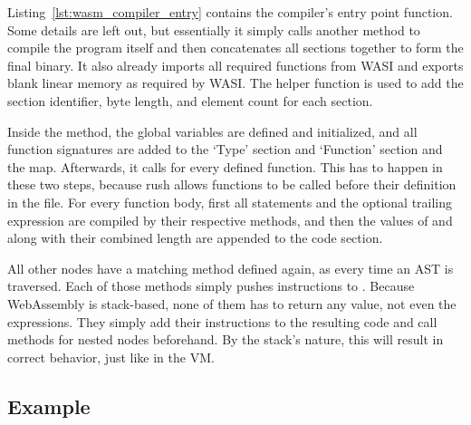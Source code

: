 Listing~\ref{lst:wasm_compiler_entry} contains the compiler's entry point function.
Some details are left out, but essentially it simply calls another method to compile the program itself and then concatenates all sections together to form the final binary.
It also already imports all required functions from WASI and exports blank linear memory as required by WASI.
The  helper function is used to add the section identifier, byte length, and element count for each section.


Inside the  method, the global variables are defined and initialized, and all function signatures are added to the `Type' section and `Function' section and the  map.
Afterwards, it calls  for every defined function.
This has to happen in these two steps, because rush allows functions to be called before their definition in the file.
For every function body, first all statements and the optional trailing expression are compiled by their respective methods, and then the values of  and  along with their combined length are appended to the code section.

All other nodes have a matching method defined again, as every time an AST is traversed.
Each of those methods simply pushes instructions to .
Because WebAssembly is stack-based, none of them has to return any value, not even the expressions.
They simply add their instructions to the resulting code and call methods for nested nodes beforehand.
By the stack's nature, this will result in correct behavior, just like in the VM.


\subsection{Example}

